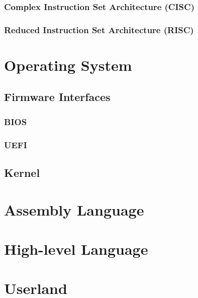 \documentclass[pdftex,10pt]{article}
\begin{document}
\subsubsection{Complex Instruction Set Architecture (CISC)}
\subsubsection{Reduced Instruction Set Architecture (RISC)}

\section{Operating System}

\subsection{Firmware Interfaces}

\subsubsection{BIOS}
\subsubsection{UEFI}

\subsection{Kernel}

\section{Assembly Language}

\section{High-level Language}

\section{Userland}
\end{document}
